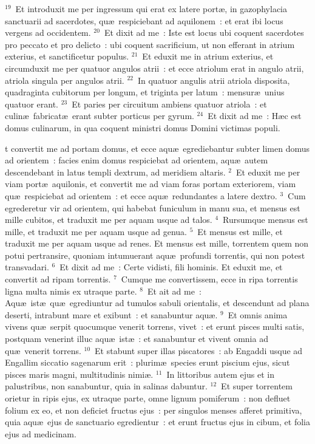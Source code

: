 ${}^{19}$~Et introduxit me per ingressum qui erat ex latere port\ae , in gazophylacia sanctuarii ad sacerdotes, qu\ae\ respiciebant ad aquilonem~: et erat ibi locus vergens ad occidentem.
${}^{20}$~Et dixit ad me~: Iste est locus ubi coquent sacerdotes pro peccato et pro delicto~: ubi coquent sacrificium, ut non efferant in atrium exterius, et sanctificetur populus.
${}^{21}$~Et eduxit me in atrium exterius, et circumduxit me per quatuor angulos atrii~: et ecce atriolum erat in angulo atrii, atriola singula per angulos atrii.
${}^{22}$~In quatuor angulis atrii atriola disposita, quadraginta cubitorum per longum, et triginta per latum~: mensur\ae\ unius quatuor erant.
${}^{23}$~Et paries per circuitum ambiens quatuor atriola~: et culin\ae\ fabricat\ae\ erant subter porticus per gyrum.
${}^{24}$~Et dixit ad me~: H\ae c est domus culinarum, in qua coquent ministri domus Domini victimas populi.

\bchapter
{}t convertit me ad portam domus, et ecce aqu\ae\ egrediebantur subter limen domus ad orientem~: facies enim domus respiciebat ad orientem, aqu\ae\ autem descendebant in latus templi dextrum, ad meridiem altaris.
${}^{2}$~Et eduxit me per viam port\ae\ aquilonis, et convertit me ad viam foras portam exteriorem, viam qu\ae\ respiciebat ad orientem~: et ecce aqu\ae\ redundantes a latere dextro.
${}^{3}$~Cum egrederetur vir ad orientem, qui habebat funiculum in manu sua, et mensus est mille cubitos, et traduxit me per aquam usque ad talos.
${}^{4}$~Rursumque mensus est mille, et traduxit me per aquam usque ad genua.
${}^{5}$~Et mensus est mille, et traduxit me per aquam usque ad renes. Et mensus est mille, torrentem quem non potui pertransire, quoniam intumuerant aqu\ae\ profundi torrentis, qui non potest transvadari.
${}^{6}$~Et dixit ad me~: Certe vidisti, fili hominis. Et eduxit me, et convertit ad ripam torrentis.
${}^{7}$~Cumque me convertissem, ecce in ripa torrentis ligna multa nimis ex utraque parte.
${}^{8}$~Et ait ad me~: Aqu\ae\ ist\ae\ qu\ae\ egrediuntur ad tumulos sabuli orientalis, et descendunt ad plana deserti, intrabunt mare et exibunt~: et sanabuntur aqu\ae .
${}^{9}$~Et omnis anima vivens qu\ae\ serpit quocumque venerit torrens, vivet~: et erunt pisces multi satis, postquam venerint illuc aqu\ae\ ist\ae~: et sanabuntur et vivent omnia ad qu\ae\ venerit torrens.
${}^{10}$~Et stabunt super illas piscatores~: ab Engaddi usque ad Engallim siccatio sagenarum erit~: plurim\ae\ species erunt piscium ejus, sicut pisces maris magni, multitudinis nimi\ae .
${}^{11}$~In littoribus autem ejus et in palustribus, non sanabuntur, quia in salinas dabuntur.
${}^{12}$~Et super torrentem orietur in ripis ejus, ex utraque parte, omne lignum pomiferum~: non defluet folium ex eo, et non deficiet fructus ejus~: per singulos menses afferet primitiva, quia aqu\ae\ ejus de sanctuario egredientur~: et erunt fructus ejus in cibum, et folia ejus ad medicinam.


